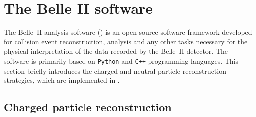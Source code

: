 \section{The Belle II software}\label{sec:belle2_software}

The Belle~II analysis software (\basftwo) \cite{Kuhr:2018lps} is an open-source software framework developed for collision event reconstruction, analysis 
and any other tasks necessary for the physical interpretation of the data recorded by the Belle~II detector.
The software is primarily based on \texttt{Python} and \texttt{C++} programming languages.
This section briefly introduces the charged and neutral particle reconstruction strategies, which are implemented in \basftwo.

\subsection{Charged particle reconstruction}\label{sec:tracking}

